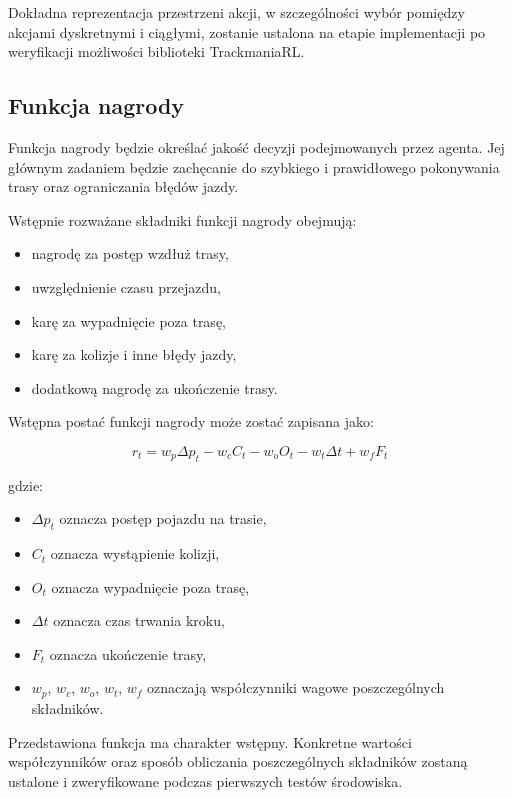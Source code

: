 \documentclass[12pt]{article}
\begin{document}
Dokładna reprezentacja przestrzeni akcji, w szczególności wybór pomiędzy akcjami dyskretnymi i ciągłymi, zostanie ustalona na etapie implementacji po weryfikacji możliwości biblioteki TrackmaniaRL.

\subsection{Funkcja nagrody}

Funkcja nagrody będzie określać jakość decyzji podejmowanych przez agenta. Jej głównym zadaniem będzie zachęcanie do szybkiego i prawidłowego pokonywania trasy oraz ograniczania błędów jazdy.

Wstępnie rozważane składniki funkcji nagrody obejmują:
\begin{itemize}
    \item nagrodę za postęp wzdłuż trasy,
    \item uwzględnienie czasu przejazdu,
    \item karę za wypadnięcie poza trasę,
    \item karę za kolizje i inne błędy jazdy,
    \item dodatkową nagrodę za ukończenie trasy.
\end{itemize}

Wstępna postać funkcji nagrody może zostać zapisana jako:

\begin{equation}
    r_t =
    w_p \Delta p_t
    - w_c C_t
    - w_o O_t
    - w_t \Delta t
    + w_f F_t
\end{equation}

gdzie:
\begin{itemize}
    \item $\Delta p_t$ oznacza postęp pojazdu na trasie,
    \item $C_t$ oznacza wystąpienie kolizji,
    \item $O_t$ oznacza wypadnięcie poza trasę,
    \item $\Delta t$ oznacza czas trwania kroku,
    \item $F_t$ oznacza ukończenie trasy,
    \item $w_p$, $w_c$, $w_o$, $w_t$, $w_f$ oznaczają współczynniki wagowe poszczególnych składników.
\end{itemize}

Przedstawiona funkcja ma charakter wstępny. Konkretne wartości współczynników oraz sposób obliczania poszczególnych składników zostaną ustalone i zweryfikowane podczas pierwszych testów środowiska.
\end{document}
